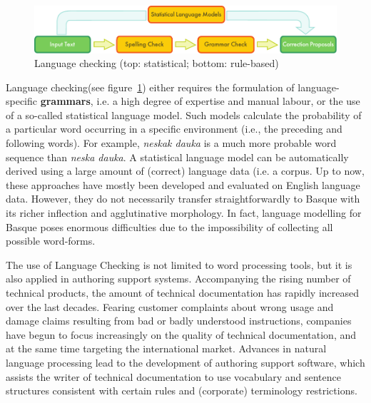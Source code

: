 \begin{multicols}{2}
\begin{figure}[htb]
  \center
  \includegraphics[width=\textwidth]{../_media/english/language_checking}
  \caption{Language checking (top: statistical; bottom: rule-based)}
  \label{fig:langcheckingaarch_en}
\end{figure}

Language checking(see figure~\ref{fig:langcheckingaarch_en}) either requires the formulation of language-specific 
\textbf{grammars}, i.e. a high degree of expertise and manual labour, or the use of a so-called statistical 
language model.  Such models calculate the probability of a particular word occurring in a specific environment (i.e., the preceding and following words). For example, \textit{neskak dauka} is a much more probable word sequence than \textit{neska dauka}. A statistical language model can be automatically derived using a large amount of (correct) language data (i.e. a 
corpus. Up to now, these approaches have mostly been developed and evaluated on English language data. However, they do not necessarily transfer straightforwardly to Basque with its richer inflection and agglutinative morphology. In fact, language modelling for Basque poses enormous difficulties due to the impossibility of collecting all possible word-forms.  

The use of Language Checking is not limited to word processing tools, but it is also applied in authoring support systems. Accompanying the rising number of technical products, the amount of technical documentation has rapidly increased over the last decades. Fearing customer complaints about wrong usage and damage claims resulting from bad or badly understood instructions, companies have begun to focus increasingly on the quality of technical documentation, and at the same time targeting the international market. Advances in natural language processing lead to the development of authoring support software, which assists the writer of technical documentation to use vocabulary and sentence structures consistent with certain rules and (corporate) terminology restrictions. 



\end{multicols}
